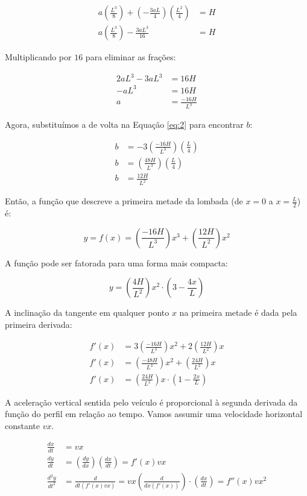\documentclass[../resumo.tex]{subfiles}
\begin{document}
	\begin{align*}
		a(\frac{L^3}{8}) + (-\frac{3aL}{4})(\frac{L^2}{4}) &=H \\
		a(\frac{L^3}{8}) - \frac{3aL^3}{16} &= H
	\end{align*}

	Multiplicando por $16$ para eliminar as frações:

	\begin{align*}
		2aL^3 - 3aL^3 &= 16H \\
		-aL^3 &= 16H \\
		a &= \frac{-16H}{L^3}
	\end{align*}

	Agora, substituímos a de volta na Equação \ref{eq:2} para encontrar $b$:

	\begin{align*}
		b &= -3(\frac{-16H}{L^3})(\frac{L}{4}) \\
		b &= (\frac{48H}{L^3})(\frac{L}{4}) \\
		b &= \frac{12H}{L^2}
	\end{align*}

	Então, a função que descreve a primeira metade da lombada (de $x = 0$ a $x = \frac{L}{2}$) é:

	\[ y = f(x) = (\frac{-16H}{L^3})x^3 + (\frac{12H}{L^2})x^2 \]

	A função pode ser fatorada para uma forma mais compacta:

	\[ y = (\frac{4H}{L^2})x^2\cdot(3-\frac{4x}{L}) \]

	A inclinação da tangente em qualquer ponto $x$ na primeira metade é dada pela primeira derivada:

	\begin{align*}
		f'(x) &= 3(\frac{-16H}{L^3})x^2 + 2(\frac{12H}{L^2})x \\
		f'(x) &= (\frac{-48H}{L^3})x^2 + (\frac{24H}{L^2})x \\
		f'(x) &= (\frac{24H}{L^2})x\cdot(1-\frac{2x}{L})
	\end{align*}

	A aceleração vertical sentida pelo veículo é proporcional à segunda derivada da função do perfil
	em relação ao tempo. Vamos assumir uma velocidade horizontal constante $vx$.

	\begin{align*}
		\frac{dx}{dt} &= vx \\
		\frac{dy}{dt} &= (\frac{dy}{dx})(\frac{dx}{dt}) = f'(x)vx \\
		\frac{d^2y}{dt^2} &= \frac{d}{dt(f'(x)vx)} = vx(\frac{d}{dx(f'(x))})\cdot(\frac{dx}{dt}) = f''(x)vx^2
	\end{align*}
\end{document}
